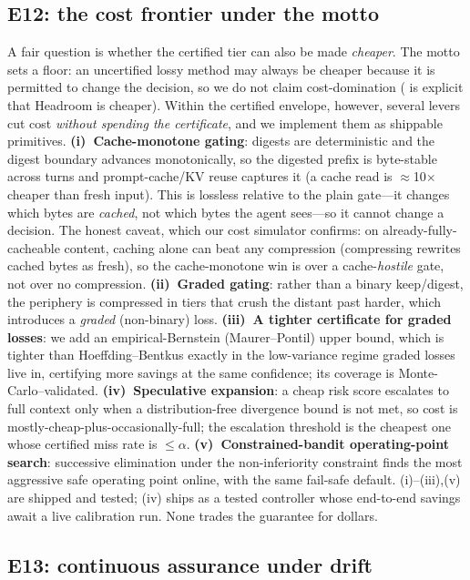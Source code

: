 \documentclass[11pt]{article}
\begin{document}
\subsection{E12: the cost frontier under the motto}
\label{sec:e12}

A fair question is whether the certified tier can also be made \emph{cheaper}. The motto sets
a floor: an uncertified lossy method may always be cheaper because it is permitted to change
the decision, so we do not claim cost-domination ( is explicit that Headroom is
cheaper). Within the certified envelope, however, several levers cut cost \emph{without
spending the certificate}, and we implement them as shippable primitives.
\textbf{(i)~Cache-monotone gating}: digests are deterministic and the digest boundary advances
monotonically, so the digested prefix is byte-stable across turns and prompt-cache/KV reuse
captures it (a cache read is $\approx$10$\times$ cheaper than fresh input). This is lossless
relative to the plain gate---it changes which bytes are \emph{cached}, not which bytes the
agent sees---so it cannot change a decision. The honest caveat, which our cost simulator
confirms: on already-fully-cacheable content, caching alone can beat any compression
(compressing rewrites cached bytes as fresh), so the cache-monotone win is over a
cache-\emph{hostile} gate, not over no compression.
\textbf{(ii)~Graded gating}: rather than a binary keep/digest, the periphery is compressed in
tiers that crush the distant past harder, which introduces a \emph{graded} (non-binary) loss.
\textbf{(iii)~A tighter certificate for graded losses}: we add an empirical-Bernstein
(Maurer--Pontil) upper bound, which is tighter than Hoeffding--Bentkus exactly in the
low-variance regime graded losses live in, certifying more savings at the same confidence; its
coverage is Monte-Carlo--validated.
\textbf{(iv)~Speculative expansion}: a cheap risk score escalates to full context only when a
distribution-free divergence bound is not met, so cost is mostly-cheap-plus-occasionally-full;
the escalation threshold is the cheapest one whose certified miss rate is $\le\alpha$.
\textbf{(v)~Constrained-bandit operating-point search}: successive elimination under the
non-inferiority constraint finds the most aggressive safe operating point online, with the same
fail-safe default. (i)--(iii),(v) are shipped and tested; (iv) ships as a tested controller
whose end-to-end savings await a live calibration run. None trades the guarantee for dollars.

\subsection{E13: continuous assurance under drift}
\label{sec:e13}
\end{document}
